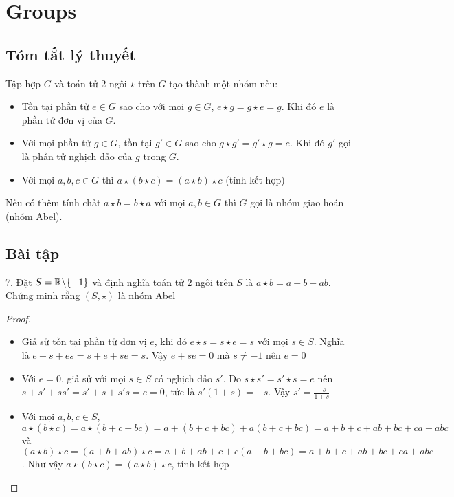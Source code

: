 \section*{Groups}

\subsection*{Tóm tắt lý thuyết}

Tập hợp $G$ và toán tử 2 ngôi $\star$ trên $G$ tạo thành một nhóm nếu:

\begin{itemize}
    \item Tồn tại phần tử $e \in G$ sao cho với mọi $g \in G$, $e \star g = g \star e = g$. Khi đó $e$ là phần tử đơn vị của $G$.
    \item Với mọi phần tử $g \in G$, tồn tại $g' \in G$ sao cho $g \star g' = g' \star g = e$. Khi đó $g'$ gọi là phần tử nghịch đảo của $g$ trong $G$.
    \item Với mọi $a, b, c \in G$ thì $a \star (b \star c) = (a \star b) \star c$ (tính kết hợp)
\end{itemize}

Nếu có thêm tính chất $a \star b = b \star a$ với mọi $a, b \in G$ thì $G$ gọi là nhóm giao hoán (nhóm Abel).

\subsection*{Bài tập}

7. Đặt $S = \mathbb{R} \backslash \{-1\}$ và định nghĩa toán tử 2 ngôi trên $S$ là $a \star b = a + b + ab$. Chứng minh rằng $(S, \star)$ là nhóm Abel

\begin{proof}
    \begin{itemize}
        \item Giả sử tồn tại phần tử đơn vị $e$, khi đó $e \star s = s \star e = s$ với mọi $s \in S$. Nghĩa là $e + s + es = s + e + se = s$. Vậy $e + se = 0$ mà $s \neq -1$ nên $e = 0$
        \item Với $e = 0$, giả sử với mọi $s \in S$ có nghịch đảo $s'$. Do $s \star s' = s' \star s = e$ nên $s + s' + ss' = s' + s + s's = e = 0$, tức là $s'(1 + s) = -s$. Vậy $s' = \frac{-s}{1 + s}$
        \item Với mọi $a, b, c \in S$, $a \star (b \star c) = a \star (b + c + bc) = a + (b+c+bc) + a (b+c+bc) = a + b + c + ab + bc + ca + abc$ và $(a \star b) \star c = (a + b + ab) \star c = a + b + ab + c + c(a+b+bc) = a + b + c + ab + bc + ca + abc$. Như vậy $a \star (b \star c) = (a \star b) \star c$, tính kết hợp
    \end{itemize}
\end{proof}

